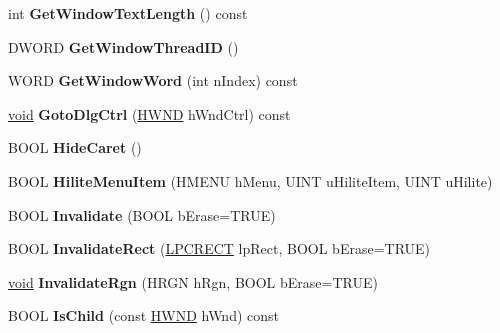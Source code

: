 \begin{DoxyCompactItemize}
int {\bfseries Get\+Window\+Text\+Length} () const
\item 
\mbox{\label{class_a_t_l_1_1_c_window_a592055198081f1811771293f306df0b1}} 
D\+W\+O\+RD {\bfseries Get\+Window\+Thread\+ID} ()
\item 
\mbox{\label{class_a_t_l_1_1_c_window_a3c8b468992a507848e14264bba90b552}} 
W\+O\+RD {\bfseries Get\+Window\+Word} (int n\+Index) const
\item 
\mbox{\label{class_a_t_l_1_1_c_window_aefac1bf1b6d6d692049337b2c69a7bf7}} 
\hyperlink{interfacevoid}{void} {\bfseries Goto\+Dlg\+Ctrl} (\hyperlink{interfacevoid}{H\+W\+ND} h\+Wnd\+Ctrl) const
\item 
\mbox{\label{class_a_t_l_1_1_c_window_a9bc6052c8d0b24d1a46d29c1abfde59f}} 
B\+O\+OL {\bfseries Hide\+Caret} ()
\item 
\mbox{\label{class_a_t_l_1_1_c_window_a83f11632ff9e733c2a11b786a25467ba}} 
B\+O\+OL {\bfseries Hilite\+Menu\+Item} (H\+M\+E\+NU h\+Menu, U\+I\+NT u\+Hilite\+Item, U\+I\+NT u\+Hilite)
\item 
\mbox{\label{class_a_t_l_1_1_c_window_ae3f0918034bd9484e3a050604f196e65}} 
B\+O\+OL {\bfseries Invalidate} (B\+O\+OL b\+Erase=T\+R\+UE)
\item 
\mbox{\label{class_a_t_l_1_1_c_window_ac23c308cc2174ddcd55ccb10f95676ef}} 
B\+O\+OL {\bfseries Invalidate\+Rect} (\hyperlink{structtag_r_e_c_t}{L\+P\+C\+R\+E\+CT} lp\+Rect, B\+O\+OL b\+Erase=T\+R\+UE)
\item 
\mbox{\label{class_a_t_l_1_1_c_window_aa2e47ccaf84cdc1691c9925ebd572eee}} 
\hyperlink{interfacevoid}{void} {\bfseries Invalidate\+Rgn} (H\+R\+GN h\+Rgn, B\+O\+OL b\+Erase=T\+R\+UE)
\item 
\mbox{\label{class_a_t_l_1_1_c_window_af0c642b93541bfbdb24fe9751961f6bc}} 
B\+O\+OL {\bfseries Is\+Child} (const \hyperlink{interfacevoid}{H\+W\+ND} h\+Wnd) const
\item 
\mbox{\label{class_a_t_l_1_1_c_window_afdf01f4b8dd91bc8eba5b637376d9f56}} 

\end{DoxyCompactItemize}

